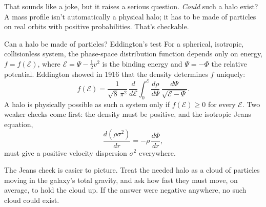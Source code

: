 

That sounds like a joke, but it raises a serious question. \emph{Could} such a halo exist? A mass profile isn't automatically a physical halo; it has to be made of particles on real orbits with positive probabilities. That's checkable.

\begin{mathbox}{Can a halo be made of particles? Eddington's test}
For a spherical, isotropic, collisionless system, the phase-space distribution function depends only on energy, $f=f(\mathcal{E})$, where $\mathcal{E}=\Psi-\tfrac12v^2$ is the binding energy and $\Psi=-\Phi$ the relative potential. Eddington showed in 1916 that the density determines $f$ uniquely:
\[
f(\mathcal{E})=\frac{1}{\sqrt8\,\pi^2}\,\frac{d}{d\mathcal{E}}\int_0^{\mathcal{E}}\frac{d\rho}{d\Psi}\,\frac{d\Psi}{\sqrt{\mathcal{E}-\Psi}}.
\]
A halo is physically possible as such a system only if $f(\mathcal{E})\ge0$ for every $\mathcal{E}$. Two weaker checks come first: the density must be positive, and the isotropic Jeans equation,
\[
\frac{d(\rho\sigma^2)}{dr}=-\rho\,\frac{d\Phi}{dr},
\]
must give a positive velocity dispersion $\sigma^2$ everywhere.
\end{mathbox}


The Jeans check is easier to picture. Treat the needed halo as a cloud of particles moving in the galaxy's total gravity, and ask how fast they must move, on average, to hold the cloud up. If the answer were negative anywhere, no such cloud could exist.






